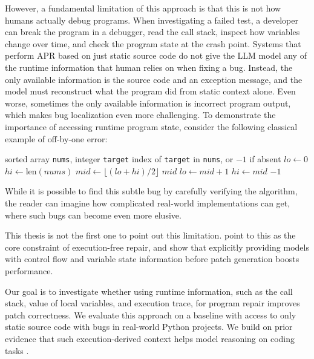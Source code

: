 However, a fundamental limitation of this approach is that this is not how humans actually debug programs.
When investigating a failed test, a developer can break the program in a debugger, read the call stack, inspect how variables
change over time, and check the program state at the crash point.
Systems that perform APR based on just static source code do not give the LLM model any of the runtime information that human
relies on when fixing a bug.
Instead, the only available information is the source code and an exception message,
and the model must reconstruct what the program did from static context alone.
Even worse, sometimes the only available information is incorrect program output, which makes bug localization even more challenging.
To demonstrate the importance of accessing runtime program state, consider the following classical example of off-by-one error:

\begin{algorithm}[ht]
\caption{Binary search with an off-by-one bug: \texttt{hi} is initialized to \texttt{len(nums)} instead of \texttt{len(nums) - 1}.}
\label{alg:binary-search-bug}
\begin{algorithmic}[1]
\Require sorted array \texttt{nums}, integer \texttt{target}
\Ensure index of \texttt{target} in \texttt{nums}, or $-1$ if absent
\State $lo \gets 0$
\State $hi \gets \text{len}(nums)$
    \State $mid \gets \lfloor (lo + hi) / 2 \rfloor$
        \Return $mid$
        \State $lo \gets mid + 1$
    \Else
        \State $hi \gets mid$
    \EndIf
\EndWhile
\State \Return $-1$
\end{algorithmic}
\end{algorithm}

While it is possible to find this subtle bug by carefully verifying the algorithm, the reader can imagine how complicated
real-world implementations can get, where such bugs can become even more elusive.

This thesis is not the first one to point out this limitation. \citet{chen2023teaching} point to this as the core constraint of
execution-free repair, and \citet{zhong2024debug} show that explicitly providing models
with control flow and variable state information before patch generation boosts performance.

Our goal is to investigate whether using runtime information, such as
the call stack, value of local variables, and execution trace, for program repair
improves patch correctness. We evaluate this approach on a baseline with access to only static source code with
bugs in real-world Python projects.
We build on prior evidence that such execution-derived context helps model reasoning on coding tasks
\citep{ni2024nextteachinglargelanguage,han2025rethinkingcapabilityfinetunedlanguage}.

